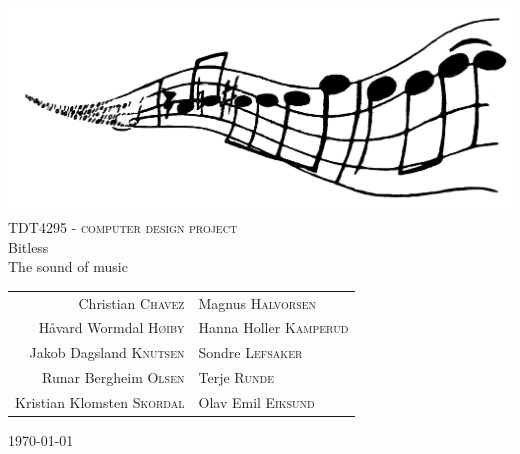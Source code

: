 \begin{titlepage}

\begin{center}

    \includegraphics[scale=0.05]{./figures/logo}\\[1cm]

\textsc{\LARGE TDT4295 - computer design project}\\[0.2cm]


{\huge Bitless}\\[0.2cm]
\small{The sound of music}\\[1cm]

\begin{table}[h]
\centering
\begin{tabular}{rl}
Christian \textsc{Chavez}			& Magnus \textsc{Halvorsen} \\
Håvard Wormdal \textsc{Høiby}		& Hanna Holler \textsc{Kamperud} \\
Jakob Dagsland \textsc{Knutsen}	& Sondre \textsc{Lefsaker} \\
Runar Bergheim \textsc{Olsen}		& Terje \textsc{Runde} \\
Kristian Klomsten \textsc{Skordal}	& Olav Emil \textsc{Eiksund}
\end{tabular}
\end{table}

\vfill
\large{\today}

\end{center}

\end{titlepage}

